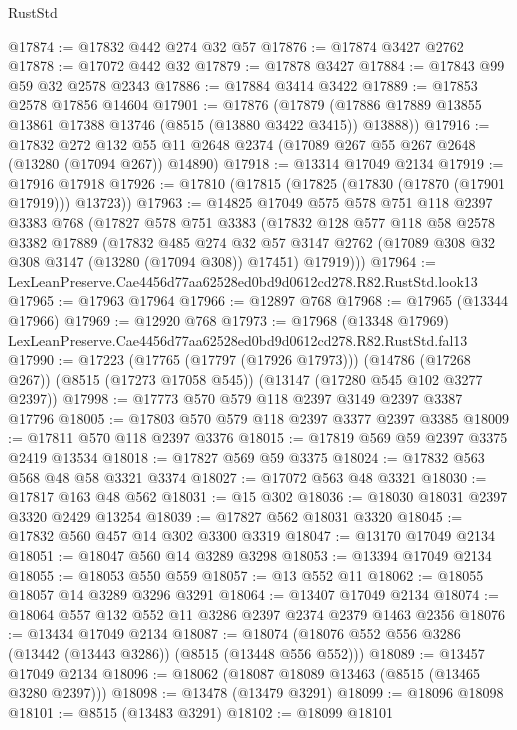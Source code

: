 \begin{lexlean}{RustStd}
\begin{coremodule}
@17874 := @17832 @442 @274 @32 @57
@17876 := @17874 @3427 @2762
@17878 := @17072 @442 @32
@17879 := @17878 @3427
@17884 := @17843 @99 @59 @32 @2578 @2343
@17886 := @17884 @3414 @3422
@17889 := @17853 @2578 @17856 @14604
@17901 := @17876
    (@17879 (@17886 @17889 @13855 @13861 @17388 @13746 (@8515 (@13880 @3422 @3415)) @13888))
@17916 := @17832
    @272
    @132
    @55
    @11
    @2648
    @2374
    (@17089 @267 @55 @267 @2648 (@13280 (@17094 @267)) @14890)
@17918 := @13314 @17049 @2134
@17919 := @17916 @17918
@17926 := @17810 (@17815 (@17825 (@17830 (@17870 (@17901 @17919))) @13723))
@17963 := @14825
    @17049
    @575
    @578
    @751
    @118
    @2397
    @3383
    @768
    (@17827
      @578
      @751
      @3383
      (@17832
        @128
        @577
        @118
        @58
        @2578
        @3382
        @17889
        (@17832
          @485
          @274
          @32
          @57
          @3147
          @2762
          (@17089 @308 @32 @308 @3147 (@13280 (@17094 @308)) @17451)
          @17919)))
@17964 := LexLeanPreserve.Cae4456d77aa62528ed0bd9d0612cd278.R82.RustStd.look13
@17965 := @17963 @17964
@17966 := @12897 @768
@17968 := @17965 (@13344 @17966)
@17969 := @12920 @768
@17973 := @17968 (@13348 @17969) LexLeanPreserve.Cae4456d77aa62528ed0bd9d0612cd278.R82.RustStd.fal13
@17990 := @17223
    (@17765 (@17797 (@17926 @17973)))
    (@14786 (@17268 @267))
    (@8515 (@17273 @17058 @545))
    (@13147 (@17280 @545 @102 @3277 @2397))
@17998 := @17773 @570 @579 @118 @2397 @3149 @2397 @3387 @17796
@18005 := @17803 @570 @579 @118 @2397 @3377 @2397 @3385
@18009 := @17811 @570 @118 @2397 @3376
@18015 := @17819 @569 @59 @2397 @3375 @2419 @13534
@18018 := @17827 @569 @59 @3375
@18024 := @17832 @563 @568 @48 @58 @3321 @3374
@18027 := @17072 @563 @48 @3321
@18030 := @17817 @163 @48 @562
@18031 := @15 @302
@18036 := @18030 @18031 @2397 @3320 @2429 @13254
@18039 := @17827 @562 @18031 @3320
@18045 := @17832 @560 @457 @14 @302 @3300 @3319
@18047 := @13170 @17049 @2134
@18051 := @18047 @560 @14 @3289 @3298
@18053 := @13394 @17049 @2134
@18055 := @18053 @550 @559
@18057 := @13 @552 @11
@18062 := @18055 @18057 @14 @3289 @3296 @3291
@18064 := @13407 @17049 @2134
@18074 := @18064 @557 @132 @552 @11 @3286 @2397 @2374 @2379 @1463 @2356
@18076 := @13434 @17049 @2134
@18087 := @18074 (@18076 @552 @556 @3286 (@13442 (@13443 @3286)) (@8515 (@13448 @556 @552)))
@18089 := @13457 @17049 @2134
@18096 := @18062 (@18087 @18089 @13463 (@8515 (@13465 @3280 @2397)))
@18098 := @13478 (@13479 @3291)
@18099 := @18096 @18098
@18101 := @8515 (@13483 @3291)
@18102 := @18099 @18101

\end{coremodule}
\end{lexlean}
